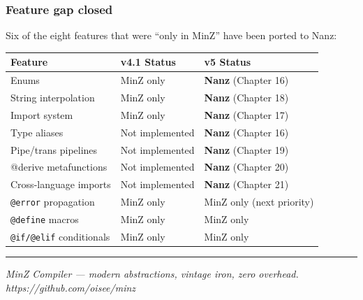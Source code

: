 \documentclass[
  11pt,
]{article}
\begin{document}
\hypertarget{feature-gap-closed}{%
\subsubsection{Feature gap closed}\label{feature-gap-closed}}

Six of the eight features that were ``only in MinZ'' have been ported to
Nanz:

\begin{longtable}[]{@{}lll@{}}
\toprule\noalign{}
Feature & v4.1 Status & v5 Status \\
\midrule\noalign{}
\endhead
\bottomrule\noalign{}
\endlastfoot
Enums & MinZ only & \textbf{Nanz} (Chapter 16) \\
String interpolation & MinZ only & \textbf{Nanz} (Chapter 18) \\
Import system & MinZ only & \textbf{Nanz} (Chapter 17) \\
Type aliases & Not implemented & \textbf{Nanz} (Chapter 16) \\
Pipe/trans pipelines & Not implemented & \textbf{Nanz} (Chapter 19) \\
@derive metafunctions & Not implemented & \textbf{Nanz} (Chapter 20) \\
Cross-language imports & Not implemented & \textbf{Nanz} (Chapter 21) \\
\texttt{@error} propagation & MinZ only & MinZ only (next priority) \\
\texttt{@define} macros & MinZ only & MinZ only \\
\texttt{@if/@elif} conditionals & MinZ only & MinZ only \\
\end{longtable}

\begin{center}\rule{0.5\linewidth}{0.5pt}\end{center}

\emph{MinZ Compiler --- modern abstractions, vintage iron, zero
overhead.} \emph{https://github.com/oisee/minz}
\end{document}
